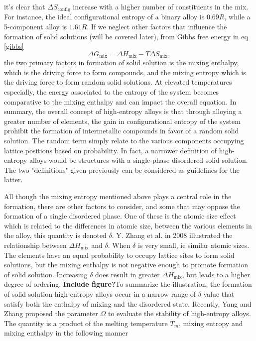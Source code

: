  it's clear that $\Delta S_{\text{config}}$ increase with a higher number of constituents in the mix. For instance, the ideal configurational entropy of a binary alloy is $0.69R$, while a 5-component alloy is $1.61R$. If we neglect other factors that influence the formation of solid solutions (will be covered later), from Gibbs free energy in eq \ref{gibbs}
\begin{equation}
\Delta G_{\text{mix}} = \Delta H_{\text{mix}} - T\Delta S_{\text{mix}}, \label{gibbs}
\end{equation} 
the two primary factors in formation of solid solution is the mixing enthalpy, which is the driving force to form compounds, and the mixing entropy which is the driving force to form random solid solutions. At elevated temperatures especially, the energy associated to the entropy of the system becomes comparative to the mixing enthalpy and can impact the overall equation. In summary, the overall concept of high-entropy alloys is that through alloying a greater number of elements, the gain in configurational entropy of the system prohibit the formation of intermetallic compounds in favor of a random solid solution. The random term simply relate to the various components occupying lattice positions based on probability. In fact, a narrower definition of high-entropy alloys would be structures with a single-phase disordered solid solution. The two "definitions" given previously can be considered as guidelines for the latter.
 
All though the mixing entropy mentioned above plays a central role in the formation, there are other factors to consider, and some that may oppose the formation of a single disordered phase. One of these is the atomic size effect which is related to the differences in atomic size, between the various elements in the alloy, this quantity is denoted $\delta$. Y. Zhang et al. in 2008 illustrated the relationship between $\Delta H_\text{mix}$ and $\delta$. When $\delta$ is very small, ie similar atomic sizes. The elements have an equal probability to occupy lattice sites to form solid solutions, but the mixing enthalpy is not negative enough to promote formation of solid solution. Increasing $\delta$ does result in greater $\Delta H_\text{mix}$, but leads to a higher degree of ordering. \textbf{Include figure?}To summarize the illustration, the formation of solid solution high-entropy alloys occur in a narrow range of $\delta$ value that satisfy both the enthalpy of mixing and the disordered state. Recently, Yang and Zhang proposed the parameter $\Omega$ to evaluate the stability of high-entropy alloys. The quantity is a product of the melting temperature $T_m$, mixing entropy and mixing enthalpy in the following manner

